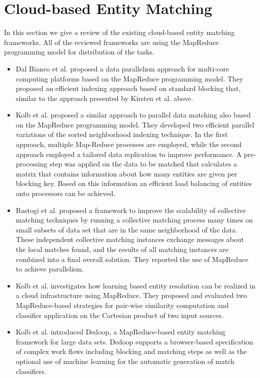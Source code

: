 \section{Cloud-based Entity Matching}
In this section we give a review of the existing cloud-based entity matching frameworks. All of the reviewed frameworks are using the MapReduce programming model for distribution of the tasks.
\begin{itemize}

\item Dal Bianco et al.\cite{DGHe11} proposed a data parallelism approach for multi-core computing platforms based on the MapReduce programming model. They proposed an efficient indexing approach based on standard blocking that, similar to the approach presented by Kirsten et al. above.

\item Kolb et al. \cite{KTRa12} proposed a similar approach to parallel data matching also based on the MapReduce programming model. They developed two efficient parallel variations of the sorted neighborhood indexing technique. In the first approach, multiple Map-Reduce processes are employed, while the second approach employed a tailored data replication to improve performance. A pre-processing step was applied on the data to be matched that calculates a matrix that contains information about how many entities are given per blocking key. Based on this information an efficient load balancing of entities onto processors can be achieved.

\item Rastogi et al. \cite{RDGa11} proposed a framework to improve the scalability of collective matching techniques by running a collective matching process many times on small subsets of data set that are in the same neighborhood of the data. These independent collective matching instances exchange messages about the local matches found, and the results of all matching instances are combined into a final overall solution. They reported the use of MapReduce to achieve parallelism.

\item Kolb et al. \cite{KKT*11} investigates how learning based entity resolution can be realized in a cloud infrastructure using MapReduce. They proposed and evaluated two MapReduce-based strategies for pair-wise similarity computation and classifier application on the Cartesian product of two input sources.

\item Kolb et al. \cite{KTRa12} introduced Dedoop, a MapReduce-based entity matching framework for large data sets. Dedoop supports a browser-based specification of complex work flows including blocking and matching steps as well as the optional use of machine learning for the automatic generation of match classifiers.
\end{itemize}
